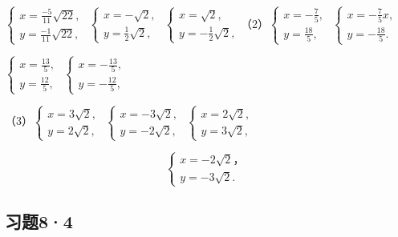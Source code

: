 \(\left\{ \begin{array}{l} x = \frac{-5}{11}\sqrt{22}, \\ y = \frac{-1}{11}\sqrt{22}, \end{array} \right.\) \(\left\{ \begin{array}{l} x = -\sqrt{2}, \\ y = \frac{1}{2}\sqrt{2}, \end{array} \right.\) \(\left\{ \begin{array}{l} x = \sqrt{2}, \\ y = -\frac{1}{2}\sqrt{2}, \end{array} \right.\)（2）\(\left\{ \begin{array}{l} x = -\frac{7}{5}, \\ y = \frac{18}{5}, \end{array} \right.\) \(\left\{ \begin{array}{l} x = -\frac{7}{5}x, \\ y = -\frac{18}{5}. \end{array} \right.\)

\(\left\{ \begin{array}{l} x = \frac{13}{5}, \\ y = \frac{12}{5}, \end{array} \right.\) \(\left\{ \begin{array}{l} x = -\frac{13}{5}, \\ y = -\frac{12}{5}, \end{array} \right.\)

（3）\(\left\{ \begin{array}{l} x = 3\sqrt{2}, \\ y = 2\sqrt{2}, \end{array} \right.\) \(\left\{ \begin{array}{l} x = -3\sqrt{2}, \\ y = -2\sqrt{2}, \end{array} \right.\) \(\left\{ \begin{array}{l} x = 2\sqrt{2}, \\ y = 3\sqrt{2}, \end{array} \right.\)

\[
\left\{ \begin{array}{l} x = - 2 \sqrt {2}\text{，} \\ y = - 3 \sqrt {2}. \end{array} \right.
\]

\subsection{习题8·4}

